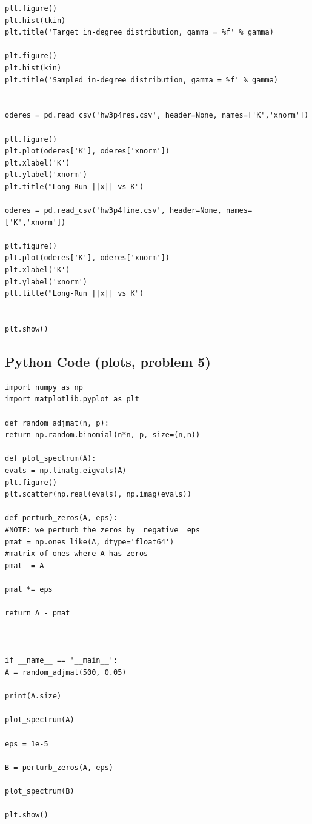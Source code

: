 \documentclass[11pt]{article}
\begin{document}
\begin{Verbatim}
plt.figure()
plt.hist(tkin)
plt.title('Target in-degree distribution, gamma = %f' % gamma)

plt.figure()
plt.hist(kin)
plt.title('Sampled in-degree distribution, gamma = %f' % gamma)


oderes = pd.read_csv('hw3p4res.csv', header=None, names=['K','xnorm'])

plt.figure()
plt.plot(oderes['K'], oderes['xnorm'])
plt.xlabel('K')
plt.ylabel('xnorm')
plt.title("Long-Run ||x|| vs K")

oderes = pd.read_csv('hw3p4fine.csv', header=None, names=['K','xnorm'])

plt.figure()
plt.plot(oderes['K'], oderes['xnorm'])
plt.xlabel('K')
plt.ylabel('xnorm')
plt.title("Long-Run ||x|| vs K")


plt.show()
\end{Verbatim}
\subsection*{Python Code (plots, problem 5)}
\begin{Verbatim}
import numpy as np
import matplotlib.pyplot as plt

def random_adjmat(n, p):
return np.random.binomial(n*n, p, size=(n,n))

def plot_spectrum(A):
evals = np.linalg.eigvals(A)
plt.figure()
plt.scatter(np.real(evals), np.imag(evals))

def perturb_zeros(A, eps):
#NOTE: we perturb the zeros by _negative_ eps
pmat = np.ones_like(A, dtype='float64')
#matrix of ones where A has zeros
pmat -= A

pmat *= eps

return A - pmat



if __name__ == '__main__':
A = random_adjmat(500, 0.05)

print(A.size)

plot_spectrum(A)

eps = 1e-5

B = perturb_zeros(A, eps)

plot_spectrum(B)

plt.show()
\end{Verbatim}
\end{document}
